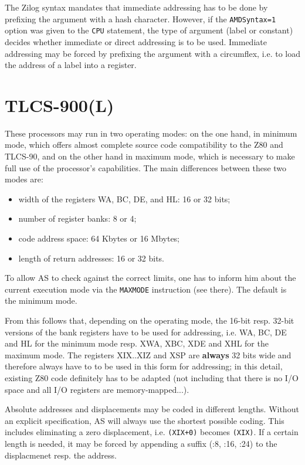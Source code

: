 \documentclass[12pt,twoside]{report}
\newcommand{\bb}[1]{{\bf #1}}
\newcommand{\tty}[1]{{\tt #1}}
\newcommand{\asname}{{AS}}
\begin{document}
The Zilog syntax mandates that immediate addressing has to be done by prefixing
the argument with a hash character.  However, if the \tty{AMDSyntax=1} option
was given to the \tty{CPU} statement, the type of argument (label or constant)
decides whether immediate or direct addressing is to be used.  Immediate addressing
may be forced by prefixing the argument with a circumflex, i.e. to load the address
of a label into a register.


\section{TLCS-900(L)}
\label{TLCS900Spec}

These processors may run in two operating modes: on the one hand, in
minimum mode, which offers almost complete source code compatibility
to the Z80 and TLCS-90, and on the other hand in maximum mode, which
is necessary to make full use of the processor's capabilities.  The
main differences between these two modes are:
\begin{itemize}
\item{width of the registers WA, BC, DE, and HL: 16 or 32 bits;}
\item{number of register banks: 8 or 4;}
\item{code address space: 64 Kbytes or 16 Mbytes;}
\item{length of return addresses: 16 or 32 bits.}
\end{itemize}
To allow \asname{} to check against the correct limits, one has to inform him
about the current execution mode via the \tty{MAXMODE} instruction (see
there).  The default is the minimum mode.

From this follows that, depending on the operating mode, the 16-bit
resp. 32-bit versions of the bank registers have to be used for
addressing, i.e. WA, BC, DE and HL for the minimum mode resp. XWA,
XBC, XDE and XHL for the maximum mode.  The registers XIX..XIZ and
XSP are \bb{always} 32 bits wide and therefore always have to to be used
in this form for addressing; in this detail, existing Z80 code
definitely has to be adapted (not including that there is no I/O
space and all I/O registers are memory-mapped...).

Absolute addresses and displacements may be coded in different
lengths.  Without an explicit specification, \asname{} will always use
the shortest possible coding.  This includes eliminating a zero
displacement, i.e. \verb!(XIX+0)! becomes \verb!(XIX)!.  If a certain
length is needed, it may be forced by appending a suffix (:8, :16,
:24) to the displacmenet resp. the address.
\end{document}
